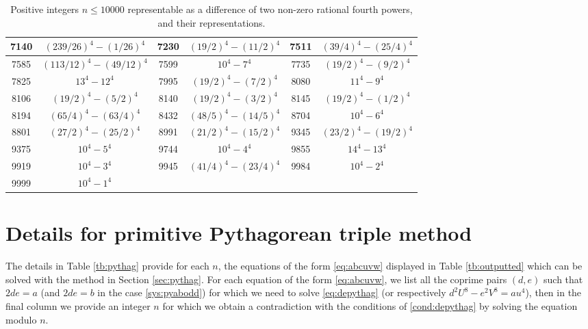 \documentclass[a4paper,12pt,english,reqno]{amsart}
\begin{document}
\begin{table}
\begin{center}
\begin{tabular}{|c|c||c|c||c|c|}
7140& $(239/26)^4-(1/26 )^4$ & %
7230 & $(19/2)^4 -(11/2 )^4$ & %
7511& $(39/4)^4-(25/4)^4$ \\\hline
7585& $(113/12)^4  -(49/12 )^4$ &%
7599 & $10^4- 7^4$&%
7735 & $(19/2)^4-(9/2)^4$ \\\hline
7825& $13^4  -12^4$ &%
7995 &$(19/2)^4- (7/2)^4$ &%
8080& $11^4- 9^4$ \\\hline
8106 & $(19/2)^4 -(5/2 )^4$ &
8140& $(19/2)^4  -(3/2 )^4$ &%
8145& $(19/2)^4  -(1/2 )^4$ \\\hline
8194& $(65/4)^4  -(63/4 )^4$ &
8432& $(48/5)^4-(14/5)^4$ &
8704& $10^4 -6^4$ \\\hline
8801& $(27/2)^4  -(25/2)^4$&%
8991 &$(21/2)^4 -( 15/2)^4$ &
9345 &$(23/2)^4 -(19/2 )^4$ \\\hline
9375& $10^4 - 5^4$ &
9744 &$10^4 - 4^4$&
9855& $14^4- 13^4$ \\\hline
9919& $10^4  -3^4$ &%
9945 & $(41/4)^4 -( 23/4 )^4$ &%
9984 &$10^4  -2^4$ \\\hline
9999& $10^4 - 1 ^4$ &&&& \\\hline

\end{tabular}
\caption{Positive integers $n\leq 10000$ representable as a difference of two non-zero rational fourth powers, and their representations. \label{tb:rationalsols}}
\end{center}
\end{table}



\appendix
\section{Details for primitive Pythagorean triple method}
The details in Table \ref{tb:pythag} provide for each $n$, the equations of the form \eqref{eq:abcuvw} displayed in Table \ref{tb:outputted} which can be solved with the method in Section \ref{sec:pythag}. For each equation of the form \eqref{eq:abcuvw}, we list all the coprime pairs $(d,e)$ such that $2de=a$ (and $2de=b$ in the case \eqref{sys:pyabodd}) for which we need to solve \eqref{eq:depythag} (or respectively $d^2U^8-e^2V^8=au^4$), then in the final column we provide an integer $n$ for which we obtain a contradiction with the conditions of \eqref{cond:depythag} by solving the equation modulo $n$.
\end{document}
